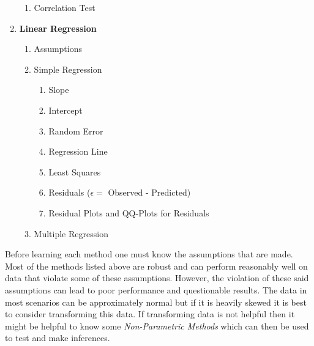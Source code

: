 \documentclass[11pt]{article}
\begin{document}
\begin{enumerate}
\begin{enumerate}
			\item Correlation Test
		\end{enumerate}
		\item \textbf{Linear Regression}
		\begin{enumerate}
			\item Assumptions
			\item Simple Regression
			\begin{enumerate}
				\item Slope
				\item Intercept
				\item Random Error
				\item Regression Line
				\item Least Squares
				\item Residuals ($\epsilon = $ Observed - Predicted)
				\item Residual Plots and QQ-Plots for Residuals
			\end{enumerate}
			\item Multiple Regression
		\end{enumerate}
	\end{enumerate}
	Before learning each method one must know the assumptions that are made. Most of the methods listed above are robust and can perform reasonably well on data that violate some of these assumptions. However, the violation of these said assumptions can lead to poor performance and questionable results. The data in most scenarios can be approximately normal but if it is heavily skewed it is best to consider transforming this data. If transforming data is not helpful then it might be helpful to know some \textit{Non-Parametric Methods} which can then be used to test and make inferences.
\end{document}

